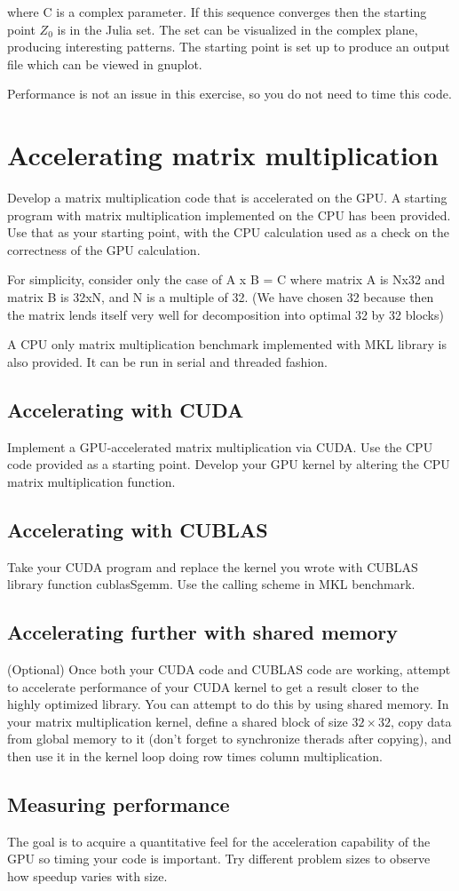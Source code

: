\documentclass{article}
\begin{document}
\noindent where C is a complex parameter.  If this sequence converges then the starting point $Z_{0}$ is in the Julia set.  The set can be visualized in the complex plane, producing interesting patterns.  The starting point is set up to produce an output file which can be viewed in gnuplot. 

Performance is not an issue in this exercise, so you do not need to time this
code. 

\section{Accelerating matrix multiplication}
Develop a matrix multiplication code that is accelerated on the GPU.  A starting program with matrix multiplication implemented on the CPU has been provided.  Use that as your starting point, with the CPU calculation used as a check on the correctness of the GPU calculation.

For simplicity, consider only the case of A x B = C where matrix A is Nx32 and matrix B is 32xN, and N is a multiple of 32.
(We have chosen 32 because then the matrix lends itself very well for decomposition into optimal 32 by 32 blocks)

A CPU only matrix multiplication benchmark implemented with MKL library is also provided.  It can be run in serial and threaded fashion.

\subsection{Accelerating with CUDA}
Implement a GPU-accelerated matrix multiplication via CUDA. Use the CPU
code provided as a starting point.  Develop your GPU kernel by altering the
CPU matrix multiplication function.

\subsection{Accelerating with CUBLAS}
Take your CUDA program and replace the kernel you wrote with CUBLAS library function cublasSgemm.  Use the calling scheme in MKL benchmark.

\subsection{Accelerating further with shared memory}
(Optional) Once both your CUDA code and CUBLAS code are working, attempt
to accelerate performance of your CUDA kernel to get a result closer to the
highly optimized library.  You can attempt to do this by using shared memory.
In your matrix multiplication kernel, define a shared block of size $32 \times 
32$, copy data from global memory to it (don't forget to synchronize therads after copying), and then use it in the kernel loop doing row times column multiplication. 

\subsection{Measuring performance}
The goal is to acquire a quantitative feel for the acceleration capability of the GPU so timing your code is important. Try different problem sizes to observe how speedup varies with size.  
\end{document}
